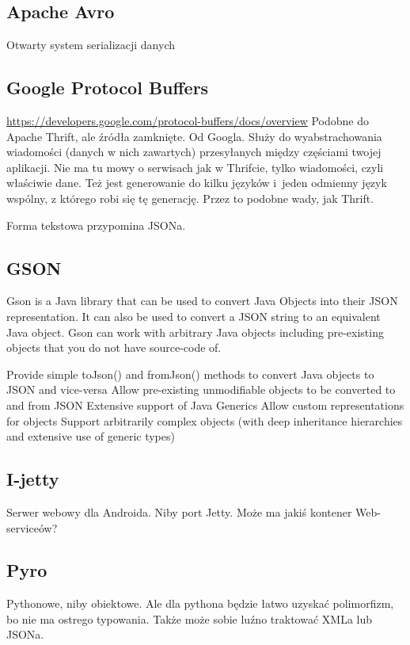 \subsection{Apache Avro}
Otwarty system serializacji danych


\subsection{Google Protocol Buffers}
\url{https://developers.google.com/protocol-buffers/docs/overview}
Podobne do Apache Thrift, ale źródła zamknięte. Od Googla. Służy do wyabstrachowania wiadomości (danych w nich zawartych) przesyłanych między częściami twojej aplikacji.
Nie ma tu mowy o serwisach jak w Thrifcie, tylko wiadomości, czyli właściwie dane.
Też jest generowanie do kilku języków i~jeden odmienny język wspólny, z którego robi się tę generację. Przez to podobne wady, jak Thrift.

Forma tekstowa przypomina JSONa.


\subsection{GSON}
Gson is a Java library that can be used to convert Java Objects into their JSON representation. It can also be used to convert a JSON string to an equivalent Java object. Gson can work with arbitrary Java objects including pre-existing objects that you do not have source-code of.

Provide simple toJson() and fromJson() methods to convert Java objects to JSON and vice-versa
Allow pre-existing unmodifiable objects to be converted to and from JSON
Extensive support of Java Generics
Allow custom representations for objects
Support arbitrarily complex objects (with deep inheritance hierarchies and extensive use of generic types)


\subsection{I-jetty}
Serwer webowy dla Androida. Niby port Jetty. Może ma jakiś kontener Web-serviceów?


\subsection{Pyro}
Pythonowe, niby obiektowe. Ale dla pythona będzie łatwo uzyskać polimorfizm, bo nie ma ostrego typowania. Także może sobie luźno traktować XMLa lub JSONa.


